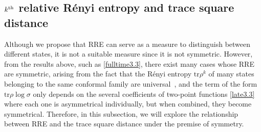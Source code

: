 \documentclass[12pt]{article}
\def \tr{\text{tr}}
\begin{document}
\subsection{$k^{\rm th}$ relative R\'enyi entropy and trace square distance}
Although we propose that RRE can serve as a measure to distinguish between different states, it is not a suitable measure since it is not symmetric. However, from the results above, such as \eqref{fulltime3.3}, there exist many cases whose RRE are symmetric, arising from the fact that the R\'enyi entropy $\tr \rho^k$ of many states belonging to the same conformal family are universal~\cite{Chen:2015usa}, and the term of the form $\tr \rho\log\sigma$ only depends on the several coefficients of two-point functions \eqref{late3.3} where each one is asymmetrical individually, but when combined, they become symmetrical. Therefore, in this subsection, we will explore the relationship between RRE and the trace square distance \cite{Zhang:2019kwu} under the premise of symmetry.
\end{document}
